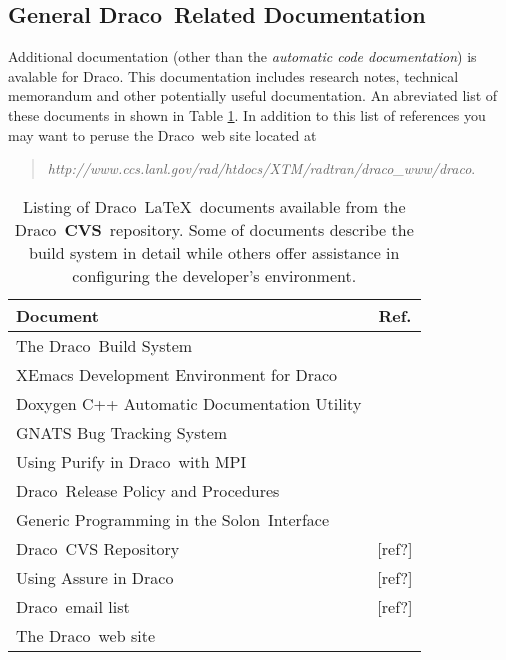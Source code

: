 \documentclass[10pt]{nmemo}
\newcommand{\draco}{{\normalfont\sffamily Draco}}
\newcommand{\solon}{{\normalfont\sffamily Solon}}
\newcommand{\cvs}{{\normalfont\bfseries CVS}}
\begin{document}
\subsection{General \draco\ Related Documentation}

Additional documentation (other than the \emph{automatic code
documentation}) is avalable for \draco.  This documentation includes
research notes, technical memorandum and other potentially useful
documentation.  An abreviated list of these documents in shown in
Table \ref{tab:draco_docs}.  In addition to this list of references
you may want to peruse the \draco\ web site located at

\begin{quote}
\emph{http://www.ccs.lanl.gov/rad/htdocs/XTM/radtran/draco\_www/draco}.
\end{quote}

\begin{table}
  \caption{Listing of \draco\ \LaTeX\ documents available from the
    \draco\ \cvs\ repository.  Some of documents describe the build
    system in detail while others offer assistance in configuring the
    developer's environment.}
  \label{tab:draco_docs}
  \begin{center}
    \begin{tabular}{lc} \hline\hline
      \multicolumn{1}{l}{Document} & \multicolumn{1}{c}{Ref.} \\ \hline
      The \draco\ Build System               & ~\cite{draco-build} \\
      XEmacs Development Environment for \draco & ~\cite{xtm:9909} \\
      Doxygen C++ Automatic Documentation Utility & ~\cite{doxygen} \\
      GNATS Bug Tracking System              & ~\cite{draco-gnats} \\
      Using Purify in \draco\ with MPI       & ~\cite{draco-purify} \\
      \draco\ Release Policy and Procedures  & ~\cite{xtm:9936}    \\
      Generic Programming in the \solon\ Interface & ~\cite{ro98} \\
      \draco\ CVS Repository                 & [ref?] \\
      Using Assure in \draco                 & [ref?] \\
      \draco\ email list                     & [ref?] \\
      The \draco\ web site                   &  ~\cite{draco-web-site} \\
      \hline\hline
    \end{tabular}
  \end{center}
\end{table}
\end{document}

